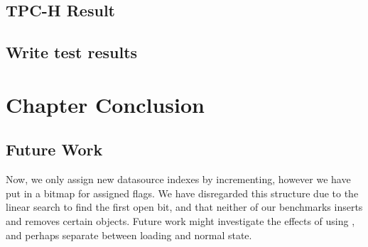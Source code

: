 \subsection{TPC-H Result}
\label{sub:TPC-H Result}

\subsection{Write test results}
\label{sub:Write test results}

\section{Chapter Conclusion}
\label{sec:Chapter Conclusion}


\subsection{Future Work}
\label{sub:Future Work}
Now, we only assign new datasource indexes by incrementing, however we have put in a bitmap for assigned flags. We have disregarded this structure due to the linear search to find the first open bit, and that neither of our benchmarks inserts and removes certain objects. Future work might investigate the effects of using , and perhaps separate between loading and normal state.

